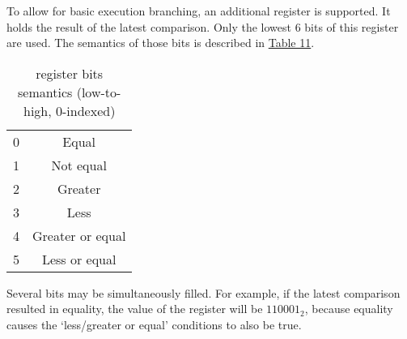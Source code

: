 To allow for basic execution branching, an additional  register is supported.
It holds the result of the latest comparison.
Only the lowest 6 bits of this register are used.
The semantics of those bits is described in \hyperlink{flags:bits}{Table 11}.

\hypertarget{flags:bits}{}
{
    \vspace{-0.4cm}
    \renewcommand{\arraystretch}{1.4}
    \begin{table}[h!]
        \centering
        \caption{ register bits semantics (low-to-high, 0-indexed)}
        \vspace{2mm}
        \begin{tabular}{| c | c |}
            \hline
            0 & Equal            \\
            1 & Not equal        \\
            2 & Greater          \\
            3 & Less             \\
            4 & Greater or equal \\
            5 & Less or equal    \\
            \hline
        \end{tabular}
    \end{table}
}

Several bits may be simultaneously filled.
For example, if the latest comparison resulted in equality, the value of the  register will be $110001_2$, because equality causes the `less/greater or equal' conditions to also be true.